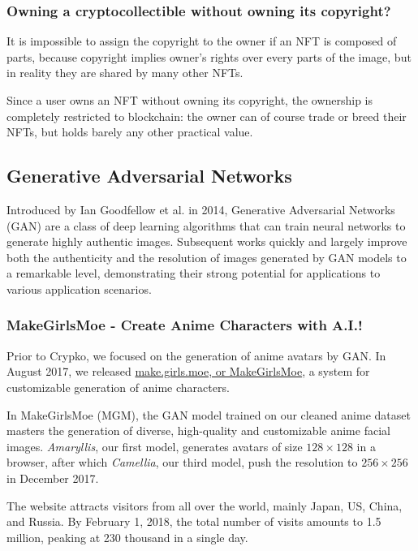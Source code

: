 \documentclass[b5paper]{article}
\begin{document}
\subsubsection{Owning a cryptocollectible without owning its copyright?}

It is impossible to assign the copyright to the owner if an NFT is composed of parts, because copyright implies owner's rights over every parts of the image, but in reality they are shared by many other NFTs.

Since a user owns an NFT without owning its copyright, the ownership is completely restricted to blockchain: the owner can of course trade or breed their NFTs, but holds barely any other practical value.

\subsection{Generative Adversarial Networks}

Introduced by Ian Goodfellow et al. in 2014, Generative Adversarial Networks (GAN)\cite{goodfellow2014generative} are a class of deep learning algorithms that can train neural networks to generate highly authentic images. Subsequent works quickly and largely improve both the authenticity and the resolution of images generated by GAN models to a remarkable level\cite{radford2015unsupervised,karras2017progressive}, 
demonstrating their strong potential for applications to various application scenarios.

\subsubsection{MakeGirlsMoe - Create Anime Characters with A.I.!}

Prior to Crypko, we focused on the generation of anime avatars by GAN. In August 2017, we released \href{http://make.girls.moe/#/}{make.girls.moe, or MakeGirlsMoe}, a system for customizable generation of anime characters.

In MakeGirlsMoe (MGM), the GAN model trained on our cleaned anime dataset masters the generation of diverse, high-quality and customizable anime facial images. \emph{Amaryllis}, our first model, generates avatars of size $128 \times 128$ in a browser, after which \emph{Camellia}, our third model, push the resolution to $256 \times 256$ in December 2017.

The website attracts visitors from all over the world, mainly Japan, US, China, and Russia. By February 1, 2018, the total number of visits amounts to 1.5 million, peaking at 230 thousand in a single day.
\end{document}
